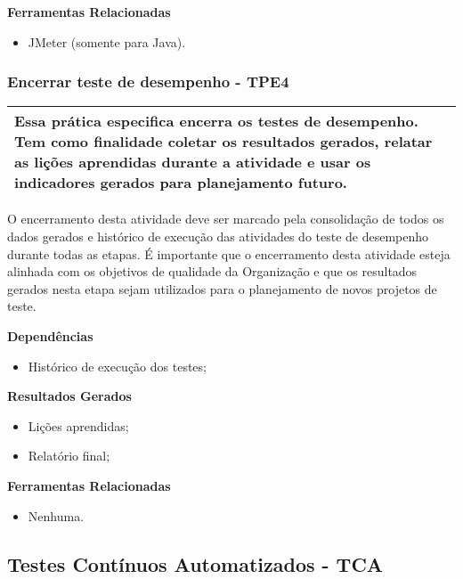 \textbf{Ferramentas Relacionadas}
\begin{itemize}
    \item JMeter (somente para Java).
\end{itemize}

\subsubsection{Encerrar teste de desempenho - TPE4}
\label{sec:tpe1}

\begin{table}[H]
\centering
\begin{tabular}{|p{130mm}|}
\hline
Essa prática especifica encerra os testes de desempenho. Tem como finalidade coletar os resultados gerados, relatar as lições aprendidas durante a atividade e usar os indicadores gerados para planejamento futuro.\\ 
\hline
\end{tabular}
\end{table}

O encerramento desta atividade deve ser marcado pela consolidação de todos os dados gerados e histórico de execução das atividades do teste de desempenho durante todas as etapas. É importante que o encerramento desta atividade esteja alinhada com os objetivos de qualidade da Organização e que os resultados gerados nesta etapa sejam utilizados para o planejamento de novos projetos de teste.

\textbf{Dependências}
\begin{itemize}
    \item Histórico de execução dos testes;
\end{itemize}

\textbf{Resultados Gerados}
\begin{itemize}
    \item Lições aprendidas;
    \item Relatório final;
\end{itemize}

\textbf{Ferramentas Relacionadas}
\begin{itemize}
    \item Nenhuma.
\end{itemize}


\subsection{Testes Contínuos Automatizados - TCA}
\label{sec:tca}


